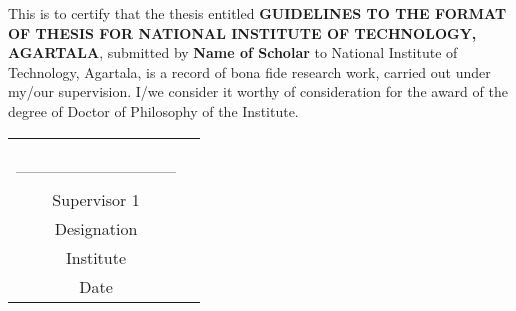 
This is to certify that the thesis entitled \textbf{ GUIDELINES TO THE FORMAT OF THESIS FOR NATIONAL INSTITUTE OF TECHNOLOGY, AGARTALA}, submitted by 
\textbf{Name of Scholar} to National Institute of Technology, Agartala, is a 
record of bona fide research work, carried out  under my/our supervision. I/we consider 
it worthy of consideration for the award of the degree of Doctor of 
Philosophy of the Institute.


\begin{centering}
\begin{tabular}{c  c }
{}&{}\\
{}&{}\\
{}&{}\\
{------------------------------}\hspace{6cm}{------------------------------}\\
{Supervisor 1}\hspace{8cm}{Supervisor 2}\\
{Designation}\hspace{8.2cm}{Designation}\\
{Institute}\hspace{8.8cm}{Institute}\\


{Date}\hspace{9.2cm}{Date}\\
\end{tabular}
\end{centering}
% 
% 





